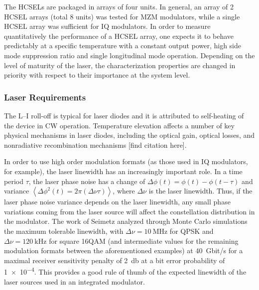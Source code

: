 The HCSELs are packaged in arrays of four units. In general, an array of 2 HCSEL arrays (total 8 units) was tested for MZM modulators, while a single HCSEL array was sufficient for IQ modulators. In order to measure quantitatively the performance of a HCSEL array, one expects it to behave predictably at a specific temperature with a constant output power, high side mode suppression ratio and single longitudinal mode operation. Depending on the level of maturity of the laser, the characterization properties are changed in priority with respect to their importance at the system level.

\subsubsection{Laser Requirements}

The L–I roll-off is typical for laser diodes and it is attributed to self-heating of the device in CW operation. Temperature elevation affects a number of key physical mechanisms in laser diodes, including the optical gain, optical losses, and nonradiative recombination mechanisms [find citation here]. 

In order to use high order modulation formats (as those used in IQ modulators, for example), the laser linewidth has an increasingly important role. In a time period $\tau$, the laser phase noise has a change of $\Delta \phi(t)= \phi(t) - \phi(t-\tau)$  and variance $\left< \Delta\phi^2(t) = 2\pi(\Delta \nu \tau) \right>$, where $\Delta\nu$ is the laser linewidth. Thus, if the laser phase noise variance depends on the laser linewidth, any small phase variations coming from the laser source will affect the constellation distribution in the modulator. The work of Seimetz \cite{SeimetzLaser08} analyzed through Monte Carlo simulations the maximum tolerable linewidth, with $\Delta \nu=\SI{10}{\mega\hertz}$ for QPSK and $\Delta \nu=\SI{120}{\kilo\hertz}$ for square 16QAM (and intermediate values for the remaining modulation formats between the aforementioned examples) at \SI{40}{\giga bit/\second} for a maximal receiver sensitivity penalty of \SI{2}{\decibel} at a bit error probability of \SI{1e-4}{}. This provides a good rule of thumb of the expected linewidth of the laser sources used in an integrated modulator.

